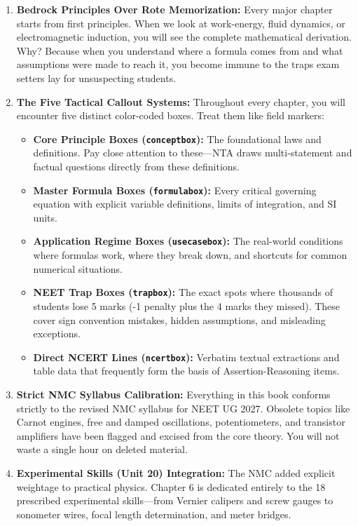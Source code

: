 \documentclass[10pt,twoside,openright]{book}
\begin{document}
\begin{enumerate}[leftmargin=*]
  \item \textbf{Bedrock Principles Over Rote Memorization:} Every major chapter starts from first principles. When we look at work-energy, fluid dynamics, or electromagnetic induction, you will see the complete mathematical derivation. Why? Because when you understand where a formula comes from and what assumptions were made to reach it, you become immune to the traps exam setters lay for unsuspecting students.
  
  \item \textbf{The Five Tactical Callout Systems:} Throughout every chapter, you will encounter five distinct color-coded boxes. Treat them like field markers:
  \begin{itemize}
    \item \textbf{Core Principle Boxes (\texttt{conceptbox}):} The foundational laws and definitions. Pay close attention to these---NTA draws multi-statement and factual questions directly from these definitions.
    \item \textbf{Master Formula Boxes (\texttt{formulabox}):} Every critical governing equation with explicit variable definitions, limits of integration, and SI units.
    \item \textbf{Application Regime Boxes (\texttt{usecasebox}):} The real-world conditions where formulas work, where they break down, and shortcuts for common numerical situations.
    \item \textbf{NEET Trap Boxes (\texttt{trapbox}):} The exact spots where thousands of students lose 5 marks (-1 penalty plus the 4 marks they missed). These cover sign convention mistakes, hidden assumptions, and misleading exceptions.
    \item \textbf{Direct NCERT Lines (\texttt{ncertbox}):} Verbatim textual extractions and table data that frequently form the basis of Assertion-Reasoning items.
  \end{itemize}

  \item \textbf{Strict NMC Syllabus Calibration:} Everything in this book conforms strictly to the revised NMC syllabus for NEET UG 2027. Obsolete topics like Carnot engines, free and damped oscillations, potentiometers, and transistor amplifiers have been flagged and excised from the core theory. You will not waste a single hour on deleted material.

  \item \textbf{Experimental Skills (Unit 20) Integration:} The NMC added explicit weightage to practical physics. Chapter 6 is dedicated entirely to the 18 prescribed experimental skills---from Vernier calipers and screw gauges to sonometer wires, focal length determination, and meter bridges.
\end{enumerate}
\end{document}
